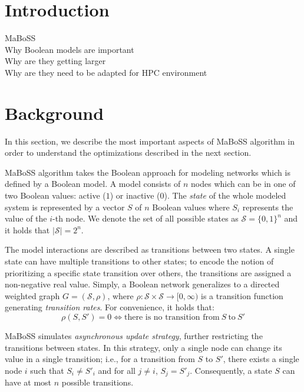 \documentclass[times, twoside]{zHenriquesLab-StyleBioRxiv}
\begin{document}
\section*{Introduction}

MaBoSS \cite{stoll2012continuous, stoll2017maboss}\\
Why Boolean models are important\\
Why are they getting larger\\
Why are they need to be adapted for HPC environment\\


\section*{Background}

In this section, we describe the most important aspects of MaBoSS algorithm in order to understand the optimizations described in the next section.  

MaBoSS algorithm takes the Boolean approach for modeling networks which is defined by a Boolean model. A model consists of $n$ nodes which can be in one of two Boolean values: active ($1$) or inactive ($0$). The \emph{state} of the whole modeled system is represented by a vector $S$ of $n$ Boolean values where $S_i$ represents the value of the $i$-th node. We denote the set of all possible states as $\mathcal{S} = \{0, 1\}^n$ and it holds that $|\mathcal{S}| = 2^n$. 

The model interactions are described as transitions between two states. A single state can have multiple transitions to other states; to encode the notion of prioritizing a specific state transition over others, the transitions are assigned a non-negative real value. Simply, a Boolean network generalizes to a directed weighted graph $G = (\mathcal{S}, \rho)$, where $\rho: \mathcal{S} \times \mathcal{S} \rightarrow [0, \infty)$ is a transition function generating \emph{transition rates}. For convenience, it holds that:
\begin{equation}
    \rho(S, S') = 0 \iff \text{there is no transition from}\ S\ \text{to}\ S'
\end{equation}

MaBoSS simulates \emph{asynchronous update strategy}, further restricting the transitions between states. In this strategy, only a single node can change its value in a single transition; i.e., for a transition from $S$ to $S'$, there exists a single node $i$ such that $S_i \neq S'_i$ and for all $j \neq i$, $S_j = S'_j$. Consequently, a state $S$ can have at most $n$ possible transitions.
\end{document}
